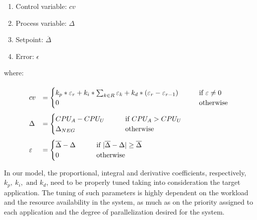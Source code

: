 \begin{enumerate}[label=-]
    \item Control variable: $cv$
    \item Process variable: $\Delta$
    \item Setpoint: $\overline{\Delta}$
    \item Error: $\epsilon$
\end{enumerate}
where:
\begin{align*}
    \renewcommand{\arraystretch}{3}
    \begin{array}{ll}
        cv &= 
        \begin{cases}
                k_{p}*\epsilon_r + k_{i}*\sum_{k\in R}\epsilon_{k} + k_d*(\epsilon_{r}-\epsilon_{r-1}) & \qquad \mbox{if } \epsilon\neq 0 \\
        	    0 & \qquad\mbox{otherwise} 
        \end{cases}\\
        \Delta &= 
            \begin{cases}
        	    CPU_{A} - CPU_{U} \hfill& \qquad \mbox{if } CPU_{A} > CPU_{U} \\
        	    \Delta_{NEG} &\qquad \text{otherwise}
    	    \end{cases}\\
    	    \epsilon &=
    	    \begin{cases}
        	    \overline{\Delta} - \Delta &\qquad\mbox{if } |\overline{\Delta}-\Delta| \geq \overline{\Delta}\mbox{}\\
        	    0 &\qquad \mbox{otherwise}
    	    \end{cases}
	\end{array}
\end{align*}

In our model, the proportional, integral and derivative coefficients, respectively, $k_p,\ k_i, \text{ and } k_d$, need to be properly tuned taking into consideration the target application. The tuning of such parameters is highly dependent on the workload and the resource availability in the system, as much as on the priority assigned to each application and the degree of parallelization desired for the system.

